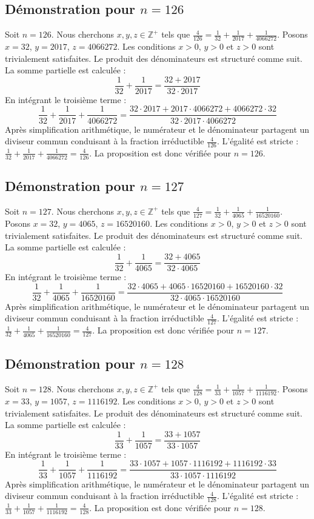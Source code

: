 \documentclass[11pt,a4paper]{article}
\begin{document}
\subsection{Démonstration pour $n = 126$}
Soit $n = 126$. Nous cherchons $x, y, z \in \mathbb{Z}^{+}$ tels que $\frac{4}{126} = \frac{1}{32} + \frac{1}{2017} + \frac{1}{4066272}$.
Posons $x = 32$, $y = 2017$, $z = 4066272$.
Les conditions $x > 0$, $y > 0$ et $z > 0$ sont trivialement satisfaites.
Le produit des dénominateurs est structuré comme suit. La somme partielle est calculée :
$$ \frac{1}{32} + \frac{1}{2017} = \frac{32+2017}{32 \cdot 2017} $$
En intégrant le troisième terme :
$$ \frac{1}{32} + \frac{1}{2017} + \frac{1}{4066272} = \frac{32 \cdot 2017 + 2017 \cdot 4066272 + 4066272 \cdot 32}{32 \cdot 2017 \cdot 4066272} $$
Après simplification arithmétique, le numérateur et le dénominateur partagent un diviseur commun conduisant à la fraction irréductible $\frac{4}{126}$.
L'égalité est stricte : $\frac{1}{32} + \frac{1}{2017} + \frac{1}{4066272} = \frac{4}{126}$.
La proposition est donc vérifiée pour $n = 126$.
\subsection{Démonstration pour $n = 127$}
Soit $n = 127$. Nous cherchons $x, y, z \in \mathbb{Z}^{+}$ tels que $\frac{4}{127} = \frac{1}{32} + \frac{1}{4065} + \frac{1}{16520160}$.
Posons $x = 32$, $y = 4065$, $z = 16520160$.
Les conditions $x > 0$, $y > 0$ et $z > 0$ sont trivialement satisfaites.
Le produit des dénominateurs est structuré comme suit. La somme partielle est calculée :
$$ \frac{1}{32} + \frac{1}{4065} = \frac{32+4065}{32 \cdot 4065} $$
En intégrant le troisième terme :
$$ \frac{1}{32} + \frac{1}{4065} + \frac{1}{16520160} = \frac{32 \cdot 4065 + 4065 \cdot 16520160 + 16520160 \cdot 32}{32 \cdot 4065 \cdot 16520160} $$
Après simplification arithmétique, le numérateur et le dénominateur partagent un diviseur commun conduisant à la fraction irréductible $\frac{4}{127}$.
L'égalité est stricte : $\frac{1}{32} + \frac{1}{4065} + \frac{1}{16520160} = \frac{4}{127}$.
La proposition est donc vérifiée pour $n = 127$.
\subsection{Démonstration pour $n = 128$}
Soit $n = 128$. Nous cherchons $x, y, z \in \mathbb{Z}^{+}$ tels que $\frac{4}{128} = \frac{1}{33} + \frac{1}{1057} + \frac{1}{1116192}$.
Posons $x = 33$, $y = 1057$, $z = 1116192$.
Les conditions $x > 0$, $y > 0$ et $z > 0$ sont trivialement satisfaites.
Le produit des dénominateurs est structuré comme suit. La somme partielle est calculée :
$$ \frac{1}{33} + \frac{1}{1057} = \frac{33+1057}{33 \cdot 1057} $$
En intégrant le troisième terme :
$$ \frac{1}{33} + \frac{1}{1057} + \frac{1}{1116192} = \frac{33 \cdot 1057 + 1057 \cdot 1116192 + 1116192 \cdot 33}{33 \cdot 1057 \cdot 1116192} $$
Après simplification arithmétique, le numérateur et le dénominateur partagent un diviseur commun conduisant à la fraction irréductible $\frac{4}{128}$.
L'égalité est stricte : $\frac{1}{33} + \frac{1}{1057} + \frac{1}{1116192} = \frac{4}{128}$.
La proposition est donc vérifiée pour $n = 128$.
\end{document}
